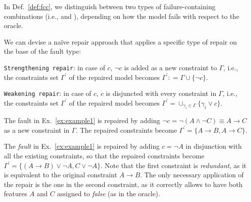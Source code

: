 \begin{tikzborder}{\cite{Gargantini16:validation}}
\begin{tikzborder}{\cite{gargantini_combinatorial_2017}}
\begin{tikzborder}{\cite{garn2019}}
\begin{tikzborder}{\cite{arcaini2019achieving}}
\begin{tikzborder}{\cite{arcaini2019varivolution}}
		\bb
		In Def.~\ref{def:fcc}, we distinguish between two types of failure-containing combinations (i.e., \underConstr and \overConstr \fcc), depending on how the model fails with respect to the oracle.
		
		We can devise a na{\"i}ve repair approach that applies a specific type of repair on the base of the fault type:
		\begin{compactenum}
			\item {\tt Strengthening repair}: in case of \underConstr \fcc $c$, $\neg c$ is added as a new constraint to $\Gamma$, i.e., the constraints set $\Gamma^\prime$ of the repaired model becomes $\Gamma^\prime: = \Gamma \cup \{\neg c\}$.
			\item {\tt Weakening repair}: in case of \overConstr \fcc $c$, $c$ is disjuncted with every constraint in $\Gamma$, i.e., the constraints set $\Gamma^\prime$ of the repaired model becomes $\Gamma^\prime = \cup_{\gamma_i \in \Gamma}\{ \gamma_i \vee c\}$.
		\end{compactenum}
		
		
		\begin{exmp}\label{ex:example_rep1}
			The \textit{\underConstr} fault in Ex.~\ref{ex:example1} is repaired by adding $\neg c = \neg(A\wedge\neg C) \equiv A \rightarrow C$ as a new constraint in $\Gamma$. The repaired constraints become $\Gamma^\prime = \{A\rightarrow B, A\rightarrow C\}$.
		\end{exmp}
		
		
		\begin{exmp}\label{ex:example_rep2}
			The \textit{\overConstr fault} in Ex.~\ref{ex:example1} is repaired by adding $c = \neg A$ in disjunction with all the existing constraints, so that the repaired constraints become $\Gamma^\prime = \{(A \rightarrow B) \vee \neg A, C \vee\neg A\}$. Note that the first constraint is {\it redundant}, as it is equivalent to the original constraint $A \rightarrow B$. The only necessary application of the repair is the one in the second constraint, as it correctly allows to have both features $A$ and $C$ assigned to {\it false} (as in the oracle).
		\end{exmp}
		
		
		

\end{tikzborder}
\end{tikzborder}
\end{tikzborder}
\end{tikzborder}
\end{tikzborder}
